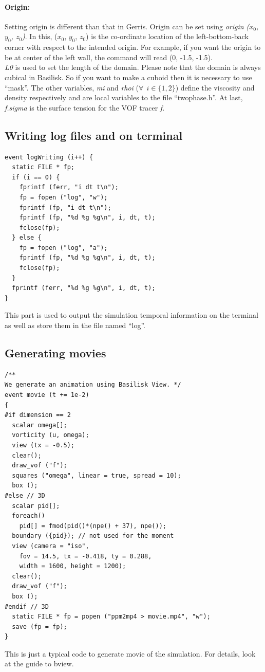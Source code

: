 \documentclass[]{article}
\begin{document}
\paragraph{\textbf{Origin:}} Setting origin is different than that in Gerris. Origin can be set using \textit{origin ($x_0$, $y_0$, $z_0$)}. In this, ($x_0$, $y_0$, $z_0$) is the co-ordinate location of the left-bottom-back corner with respect to the intended origin. For example, if you want the origin to be at center of the left wall, the command will read (0, -1.5, -1.5).\\
\textit{L0} is used to set the length of the domain. Please note that the domain is always cubical in Basilisk. So if you want to make a cuboid then it is necessary to use \textquotedblleft mask\textquotedblright. The other variables, \textit{mi} and \textit{rhoi} ($\forall\:\:i \in \{1, 2\}$) define the viscosity and density respectively and are local variables to the file \textquotedblleft twophase.h\textquotedblright. At last, \textit{f.sigma} is the surface tension for the VOF tracer \textit{f}.
\subsection{Writing log files and on terminal}
\begin{verbatim}
event logWriting (i++) {
  static FILE * fp;
  if (i == 0) {
    fprintf (ferr, "i dt t\n");
    fp = fopen ("log", "w");
    fprintf (fp, "i dt t\n");
    fprintf (fp, "%d %g %g\n", i, dt, t);
    fclose(fp);
  } else {
    fp = fopen ("log", "a");
    fprintf (fp, "%d %g %g\n", i, dt, t);
    fclose(fp);
  }
  fprintf (ferr, "%d %g %g\n", i, dt, t);
}
\end{verbatim}
This part is used to output the simulation temporal information on the terminal as well as store them in the file named \textquotedblleft log\textquotedblright.
\subsection{Generating movies}
\begin{verbatim}
/**
We generate an animation using Basilisk View. */
event movie (t += 1e-2)
{
#if dimension == 2
  scalar omega[];
  vorticity (u, omega);
  view (tx = -0.5);
  clear();
  draw_vof ("f");
  squares ("omega", linear = true, spread = 10);
  box ();
#else // 3D
  scalar pid[];
  foreach()
    pid[] = fmod(pid()*(npe() + 37), npe());
  boundary ({pid}); // not used for the moment
  view (camera = "iso",
	fov = 14.5, tx = -0.418, ty = 0.288,
	width = 1600, height = 1200);
  clear();
  draw_vof ("f");
  box ();
#endif // 3D
  static FILE * fp = popen ("ppm2mp4 > movie.mp4", "w");
  save (fp = fp);
}
\end{verbatim}
This is just a typical code to generate movie of the simulation. For details, look at the guide to bview.
\end{document}
